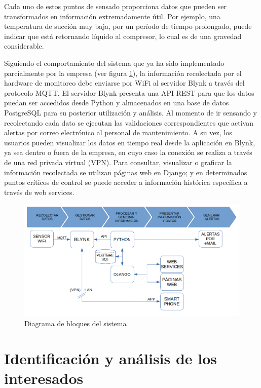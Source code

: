 \documentclass[
11pt, %
]{charter}
\begin{document}
Cada uno de estos puntos de sensado proporciona datos que pueden ser transformados en información extremadamente útil. Por ejemplo, una temperatura de succión muy baja, por un período de tiempo prolongado, puede indicar que está retornando líquido al compresor, lo cual es de una gravedad considerable.

Siguiendo el comportamiento del sistema que ya ha sido implementado parcialmente por la empresa (ver figura \ref{fig:diagramabloques}), la información recolectada por el hardware de monitoreo debe enviarse por WiFi al servidor Blynk a través del protocolo MQTT. El servidor Blynk presenta una API REST para que los datos puedan ser accedidos desde Python y almacenados en una base de datos PostgreSQL para su posterior utilización y análisis. Al momento de ir sensando y recolectando cada dato se ejecutan las validaciones correspondientes que activan alertas por correo electrónico al personal de mantenimiento. A su vez, los usuarios pueden visualizar los datos en tiempo real desde la aplicación en Blynk, ya sea dentro o fuera de la empresa, en cuyo caso la conexión se realiza a través de una red privada virtual (VPN). Para consultar, visualizar o graficar la información recolectada se utilizan páginas web en Django; y en determinados puntos críticos de control se puede acceder a información histórica específica a través de web services.

\begin{figure}[htpb]
\centering 
\includegraphics[width=.9\textwidth]{./Figuras/diagramabloques.png}
\caption{Diagrama de bloques del sistema}
\label{fig:diagramabloques}
\end{figure}

\section{Identificación y análisis de los interesados}
\label{sec:interesados}
\end{document}
